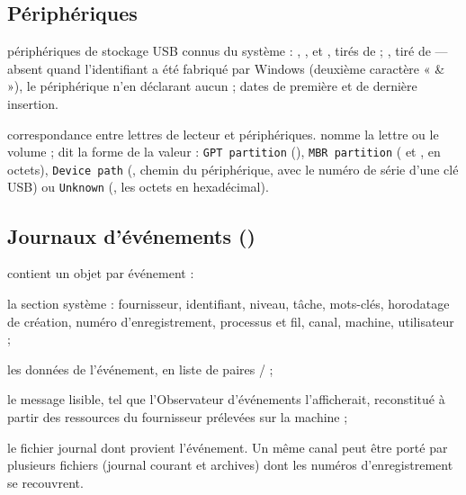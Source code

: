 \documentclass[11pt,a4paper,oneside]{report}
\begin{document}
\subsection{Périphériques}

\begin{description}[style=nextline,leftmargin=1.2em]
  \item[\fichier{Usbstor.json}] périphériques de stockage USB connus du système :
        , ,  et , tirés
        de  ; , tiré de 
        — absent quand l'identifiant a été fabriqué par Windows (deuxième
        caractère « \& »), le périphérique n'en déclarant aucun ; dates de
        première et de dernière insertion.
  \item[\fichier{mounted\_device.json}] correspondance entre lettres de lecteur et
        périphériques.  nomme la lettre ou le volume ;
         dit la forme de la valeur : \texttt{GPT partition}
        (), \texttt{MBR partition}
        ( et , en octets),
        \texttt{Device path} (, chemin du périphérique, avec le
        numéro de série d'une clé USB) ou \texttt{Unknown} (, les
        octets en hexadécimal).
\end{description}

\subsection{Journaux d'événements ()}

 contient un objet par événement :

\begin{description}[style=nextline,leftmargin=1.2em]
  \item[\champ{EvtSystem*}] la section système : fournisseur, identifiant,
        niveau, tâche, mots-clés, horodatage de création, numéro d'enregistrement,
        processus et fil, canal, machine, utilisateur ;
  \item[\champ{EvtEventData}] les données de l'événement, en liste de paires
         /  ;
  \item[\champ{EvtEventMessage}] le message lisible, tel que l'Observateur
        d'événements l'afficherait, reconstitué à partir des ressources du
        fournisseur prélevées sur la machine ;
  \item[\champ{EvtSourceLog}] le fichier journal dont provient l'événement. Un
        même canal peut être porté par plusieurs fichiers (journal courant et
        archives) dont les numéros d'enregistrement se recouvrent.
\end{description}
\end{document}
